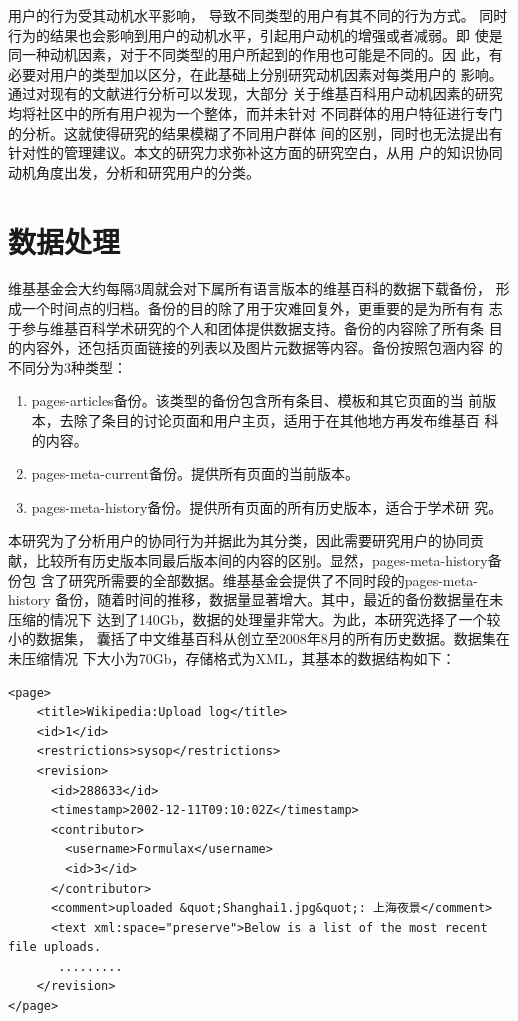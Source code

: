 用户的行为受其动机水平影响，
导致不同类型的用户有其不同的行为方式。
同时行为的结果也会影响到用户的动机水平，引起用户动机的增强或者减弱。即
使是同一种动机因素，对于不同类型的用户所起到的作用也可能是不同的。因
此，有必要对用户的类型加以区分，在此基础上分别研究动机因素对每类用户的
影响。通过对现有的文献进行分析可以发现，大部分
关于维基百科用户动机因素的研究均将社区中的所有用户视为一个整体，而并未针对
不同群体的用户特征进行专门的分析。这就使得研究的结果模糊了不同用户群体
间的区别，同时也无法提出有针对性的管理建议。本文的研究力求弥补这方面的研究空白，从用
户的知识协同动机角度出发，分析和研究用户的分类。

\section{数据处理}
\label{sec:wikimedia-data}

维基基金会大约每隔3周就会对下属所有语言版本的维基百科的数据下载备份，
形成一个时间点的归档。备份的目的除了用于灾难回复外，更重要的是为所有有
志于参与维基百科学术研究的个人和团体提供数据支持。备份的内容除了所有条
目的内容外，还包括页面链接的列表以及图片元数据等内容。备份按照包涵内容
的不同分为3种类型：
\begin{enumerate}
\item pages-articles备份。该类型的备份包含所有条目、模板和其它页面的当
  前版本，去除了条目的讨论页面和用户主页，适用于在其他地方再发布维基百
  科的内容。
\item pages-meta-current备份。提供所有页面的当前版本。
\item pages-meta-history备份。提供所有页面的所有历史版本，适合于学术研
  究。
\end{enumerate}

本研究为了分析用户的协同行为并据此为其分类，因此需要研究用户的协同贡
献，比较所有历史版本同最后版本间的内容的区别。显然，pages-meta-history备份包
含了研究所需要的全部数据。维基基金会提供了不同时段的pages-meta-history
备份，随着时间的推移，数据量显著增大。其中，最近的备份数据量在未压缩的情况下
达到了140Gb，数据的处理量非常大。为此，本研究选择了一个较小的数据集，
囊括了中文维基百科从创立至2008年8月的所有历史数据。数据集在未压缩情况
下大小为70Gb，存储格式为XML，其基本的数据结构如下：

\begin{verbatim}
<page>
    <title>Wikipedia:Upload log</title>
    <id>1</id>
    <restrictions>sysop</restrictions>
    <revision>
      <id>288633</id>
      <timestamp>2002-12-11T09:10:02Z</timestamp>
      <contributor>
        <username>Formulax</username>
        <id>3</id>
      </contributor>
      <comment>uploaded &quot;Shanghai1.jpg&quot;: 上海夜景</comment>
      <text xml:space="preserve">Below is a list of the most recent file uploads.
       .........
    </revision>
</page>
\end{verbatim}

